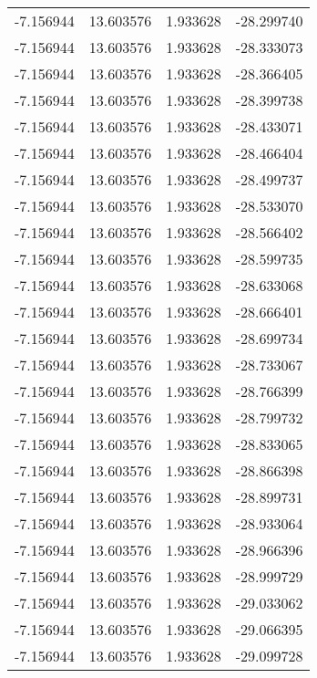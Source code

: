 \begin{tabular}{rrrr}
       -7.156944 &        13.603576 &    1.933628 & -28.299740 \\
       -7.156944 &        13.603576 &    1.933628 & -28.333073 \\
       -7.156944 &        13.603576 &    1.933628 & -28.366405 \\
       -7.156944 &        13.603576 &    1.933628 & -28.399738 \\
       -7.156944 &        13.603576 &    1.933628 & -28.433071 \\
       -7.156944 &        13.603576 &    1.933628 & -28.466404 \\
       -7.156944 &        13.603576 &    1.933628 & -28.499737 \\
       -7.156944 &        13.603576 &    1.933628 & -28.533070 \\
       -7.156944 &        13.603576 &    1.933628 & -28.566402 \\
       -7.156944 &        13.603576 &    1.933628 & -28.599735 \\
       -7.156944 &        13.603576 &    1.933628 & -28.633068 \\
       -7.156944 &        13.603576 &    1.933628 & -28.666401 \\
       -7.156944 &        13.603576 &    1.933628 & -28.699734 \\
       -7.156944 &        13.603576 &    1.933628 & -28.733067 \\
       -7.156944 &        13.603576 &    1.933628 & -28.766399 \\
       -7.156944 &        13.603576 &    1.933628 & -28.799732 \\
       -7.156944 &        13.603576 &    1.933628 & -28.833065 \\
       -7.156944 &        13.603576 &    1.933628 & -28.866398 \\
       -7.156944 &        13.603576 &    1.933628 & -28.899731 \\
       -7.156944 &        13.603576 &    1.933628 & -28.933064 \\
       -7.156944 &        13.603576 &    1.933628 & -28.966396 \\
       -7.156944 &        13.603576 &    1.933628 & -28.999729 \\
       -7.156944 &        13.603576 &    1.933628 & -29.033062 \\
       -7.156944 &        13.603576 &    1.933628 & -29.066395 \\
       -7.156944 &        13.603576 &    1.933628 & -29.099728 \\

\end{tabular}
